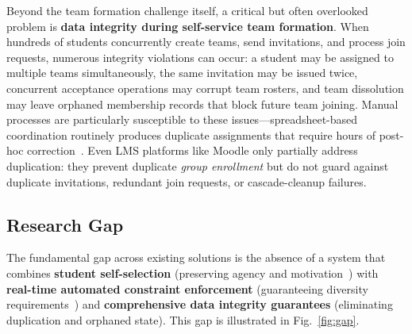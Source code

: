 \documentclass[conference]{IEEEtran}
\begin{document}
Beyond the team formation challenge itself, a critical but often overlooked problem is \textbf{data integrity during self-service team formation}. When hundreds of students concurrently create teams, send invitations, and process join requests, numerous integrity violations can occur: a student may be assigned to multiple teams simultaneously, the same invitation may be issued twice, concurrent acceptance operations may corrupt team rosters, and team dissolution may leave orphaned membership records that block future team joining. Manual processes are particularly susceptible to these issues---spreadsheet-based coordination routinely produces duplicate assignments that require hours of post-hoc correction~\cite{felder2000}. Even LMS platforms like Moodle only partially address duplication: they prevent duplicate \textit{group enrollment} but do not guard against duplicate invitations, redundant join requests, or cascade-cleanup failures.

\subsection{Research Gap}

The fundamental gap across existing solutions is the absence of a system that combines \textbf{student self-selection} (preserving agency and motivation~\cite{chapman2006}) with \textbf{real-time automated constraint enforcement} (guaranteeing diversity requirements~\cite{oakley2004}) and \textbf{comprehensive data integrity guarantees} (eliminating duplication and orphaned state). This gap is illustrated in Fig.~\ref{fig:gap}.
\end{document}
